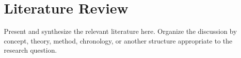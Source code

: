 \chapter{Literature Review}

Present and synthesize the relevant literature here. Organize the discussion by
concept, theory, method, chronology, or another structure appropriate to the
research question.
